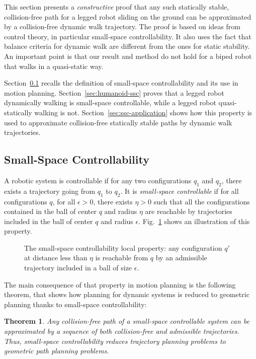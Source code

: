 \documentclass{article}
\newtheorem{theorem}{Theorem}
\begin{document}
This section presents a \textit{constructive} proof that any such statically stable, 
collision-free path for a legged robot sliding
on the ground can be approximated by a collision-free dynamic walk trajectory.
The proof is based on ideas from control theory, in particular small-space 
controllability. It also uses the fact that balance criteria for dynamic walk are different
from the ones for static stability. An important point is that our result and method do not hold
for a biped robot that walks in a quasi-static way. 

Section~\ref{sec:ssc} recalls the definition of small-space controllability and its
use in motion planning. Section~\ref{sec:humanoid-ssc} proves that a legged robot
dynamically walking is small-space controllable, while a legged robot quasi-statically
walking is not. Section~\ref{sec:ssc-application} shows how this property is used to
approximate collision-free statically stable paths by dynamic walk trajectories.


\subsection{Small-Space Controllability}
\label{sec:ssc} 

A  robotic system  is  controllable  if  for any two  configurations
$q_1$ and $q_2$,  there exists  a
trajectory  going  from  $q_1$ to  $q_2$.  It  is  
\textit{small-space  controllable} if for all configurations  $q$, 
for all $\epsilon >0$, there
exists $\eta >0$ such that all the configurations contained in the ball of center
$q$ and radius $\eta$ are reachable by trajectories included in the
ball of center $q$ and radius $\epsilon$. Fig.~\ref{fig:ssc1} shows an illustration
of this property.

\begin{figure}[h]
  \centering
  

  \caption{The small-space controllability local property:  any configuration $q'$ 
    at distance less than
    $\eta$ is reachable from $q$ by an admissible trajectory included in
    a ball of size $\epsilon$.}
  \label{fig:ssc1}
\end{figure}

The main  consequence of  that property  
in  motion planning  is the following theorem, that shows how planning for
dynamic systems is reduced to geometric planning
thanks to small-space controllability:

\begin{theorem}
  \label{thm:ssc}
  Any collision-free path of a small-space controllable system can be approximated
  by a sequence of both collision-free and admissible trajectories. Thus, small-space 
  controllability reduces trajectory planning problems to geometric path planning problems.
\end{theorem}
\end{document}
